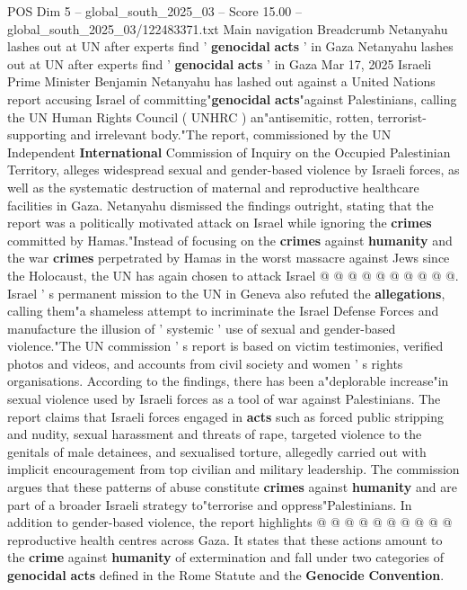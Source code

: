 \begin{textsample}{POS Dim 5 – global\_south\_2025\_03 – Score 15.00 – global\_south\_2025\_03/122483371.txt}  \label{ex:f5_pos_183}
Main navigation Breadcrumb Netanyahu lashes out at UN after experts find ' \textbf{genocidal} \textbf{acts} ' in Gaza Netanyahu lashes out at UN after experts find ' \textbf{genocidal} \textbf{acts} ' in Gaza Mar 17, 2025 Israeli Prime Minister Benjamin Netanyahu has lashed out against a United Nations report accusing Israel of committing"\textbf{genocidal} \textbf{acts}"against Palestinians, calling the UN Human Rights Council ( UNHRC ) an"antisemitic, rotten, terrorist-supporting and irrelevant body."The report, commissioned by the UN Independent \textbf{International} Commission of Inquiry on the Occupied Palestinian Territory, alleges widespread sexual and gender-based violence by Israeli forces, as well as the systematic destruction of maternal and reproductive healthcare facilities in Gaza.
Netanyahu dismissed the findings outright, stating that the report was a politically motivated attack on Israel while ignoring the \textbf{crimes} committed by Hamas."Instead of focusing on the \textbf{crimes} against \textbf{humanity} and the war \textbf{crimes} perpetrated by Hamas in the worst massacre against Jews since the Holocaust, the UN has again chosen to attack Israel @ @ @ @ @ @ @ @ @ @.
Israel ' s permanent mission to the UN in Geneva also refuted the \textbf{allegations}, calling them"a shameless attempt to incriminate the Israel Defense Forces and manufacture the illusion of ' systemic ' use of sexual and gender-based violence."The UN commission ' s report is based on victim testimonies, verified photos and videos, and accounts from civil society and women ' s rights organisations.
According to the findings, there has been a"deplorable increase"in sexual violence used by Israeli forces as a tool of war against Palestinians.
The report claims that Israeli forces engaged in \textbf{acts} such as forced public stripping and nudity, sexual harassment and threats of rape, targeted violence to the genitals of male detainees, and sexualised torture, allegedly carried out with implicit encouragement from top civilian and military leadership.
The commission argues that these patterns of abuse constitute \textbf{crimes} against \textbf{humanity} and are part of a broader Israeli strategy to"terrorise and oppress"Palestinians.
In addition to gender-based violence, the report highlights @ @ @ @ @ @ @ @ @ @ reproductive health centres across Gaza.
It states that these actions amount to the \textbf{crime} against \textbf{humanity} of extermination and fall under two categories of \textbf{genocidal} \textbf{acts} defined in the Rome Statute and the \textbf{Genocide} \textbf{Convention}.

\end{textsample}
